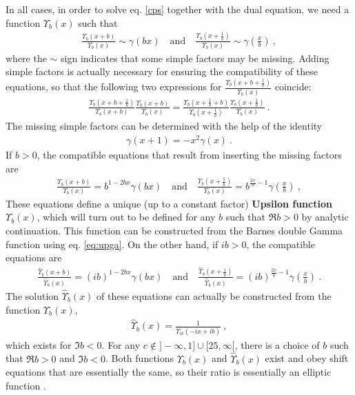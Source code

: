 \documentclass[12pt, a4paper, notitlepage, twoside]{report}
\numberwithin{equation}{section}
\theoremstyle{break}
\begin{document}
In all cases, in order to solve eq. \eqref{cps} together with the dual equation, we need a function $\Upsilon_b(x)$ such that 
\begin{align}
 \frac{\Upsilon_b(x+b)}{\Upsilon_b(x)} \sim \gamma(bx)\quad \text{and} \quad \frac{\Upsilon_b(x+\frac{1}{b})}{\Upsilon_b(x)} \sim \gamma(\tfrac{x}{b})\ ,
\end{align}
where the $\sim$ sign indicates that some simple factors may be missing.
Adding simple factors is actually necessary for ensuring the compatibility of these equations, so that the following two expressions for $ \frac{\Upsilon_b(x+b+\frac{1}{b})}{\Upsilon_b(x)}$ coincide:
\begin{align}
  \frac{\Upsilon_b(x+b+\frac{1}{b})}{\Upsilon_b(x+b)} \frac{\Upsilon_b(x+b)}{\Upsilon_b(x)} = \frac{\Upsilon_b(x+\frac{1}{b}+b)}{\Upsilon_b(x+\frac{1}{b})} \frac{\Upsilon_b(x+\frac{1}{b})}{\Upsilon_b(x)} \ .
\end{align}
The missing simple factors can be determined with the help of the identity
\begin{align}
 \gamma(x+1) = -x^2 \gamma(x) \ .
\end{align}
If $b>0$, the compatible equations that result from inserting the missing factors are 
\begin{align}
  \boxed{\frac{\Upsilon_b(x+b)}{\Upsilon_b(x)} = b^{1-2bx} \gamma(bx)}\quad \text{and} \quad \boxed{\frac{\Upsilon_b(x+\frac{1}{b})}{\Upsilon_b(x)} = b^{\frac{2x}{b}-1} \gamma(\tfrac{x}{b})}\ ,
\label{upup}
\end{align}
These equations define a unique (up to a constant factor) \textbf{Upsilon function} $\Upsilon_b(x)$, which will turn out to be defined for any $b$ such that $\Re b > 0$ by analytic continuation. 
This function can be constructed from the Barnes double Gamma function using eq. \eqref{eq:upga}.
On the other hand, if $ib>0$, the compatible equations are 
\begin{align}
 \frac{\hat{\Upsilon}_b(x+b)}{\hat{\Upsilon}_b(x)} = (ib)^{1-2bx} \gamma(bx)\quad \text{and} \quad \frac{\hat{\Upsilon}_b(x+\frac{1}{b})}{\hat{\Upsilon}_b(x)} = (ib)^{\frac{2x}{b}-1} \gamma(\tfrac{x}{b})\ .
\end{align}
The solution $\hat\Upsilon_b(x)$ of these equations can actually be constructed from the function $\Upsilon_b(x)$,
\begin{align}
 \boxed{ \hat{\Upsilon}_b(x) = \frac{1}{\Upsilon_{ib}(-ix+ib)} }\ ,
\label{tub}
\end{align}
which exists for $\Im b < 0$. 
For any $c\notin ]-\infty, 1] \cup [25,\infty[$, there is a choice of $b$ such that $\Re b>0$ and $\Im b<0$. 
Both functions $\Upsilon_b(x)$ and $\hat\Upsilon_b(x)$ exist and obey shift equations that are essentially the same, so their ratio is essentially an elliptic function \cite{zam05}. 
\end{document}
